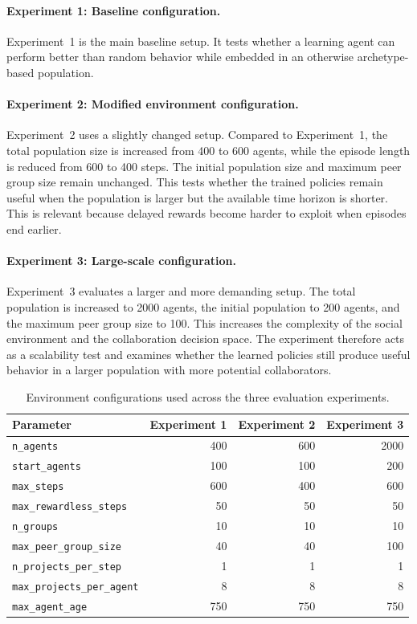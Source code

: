 \documentclass[english,bachelor]{hsluthesis}
\begin{document}
\paragraph{Experiment 1: Baseline configuration.}
Experiment~1 is the main baseline setup. It tests whether a learning agent can perform better than random behavior while embedded in an otherwise archetype-based population.

\paragraph{Experiment 2: Modified environment configuration.}
Experiment~2 uses a slightly changed setup. Compared to Experiment~1, the total population size is increased from 400 to 600 agents, while the episode length is reduced from 600 to 400 steps. The initial population size and maximum peer group size remain unchanged. This tests whether the trained policies remain useful when the population is larger but the available time horizon is shorter. This is relevant because delayed rewards become harder to exploit when episodes end earlier.

\paragraph{Experiment 3: Large-scale configuration.}
Experiment~3 evaluates a larger and more demanding setup. The total population is increased to 2000 agents, the initial population to 200 agents, and the maximum peer group size to 100. This increases the complexity of the social environment and the collaboration decision space. The experiment therefore acts as a scalability test and examines whether the learned policies still produce useful behavior in a larger population with more potential collaborators.

\begin{table}[H]
\centering
\begin{tabular}{l r r r}
\hline
Parameter & Experiment 1 & Experiment 2 & Experiment 3 \\
\hline
\texttt{n\_agents} & 400 & 600 & 2000 \\
\texttt{start\_agents} & 100 & 100 & 200 \\
\texttt{max\_steps} & 600 & 400 & 600 \\
\texttt{max\_rewardless\_steps} & 50 & 50 & 50 \\
\texttt{n\_groups} & 10 & 10 & 10 \\
\texttt{max\_peer\_group\_size} & 40 & 40 & 100 \\
\texttt{n\_projects\_per\_step} & 1 & 1 & 1 \\
\texttt{max\_projects\_per\_agent} & 8 & 8 & 8 \\
\texttt{max\_agent\_age} & 750 & 750 & 750 \\
\hline
\end{tabular}
\caption{Environment configurations used across the three evaluation experiments.}
\label{tab:env_configs}
\end{table}
\end{document}
